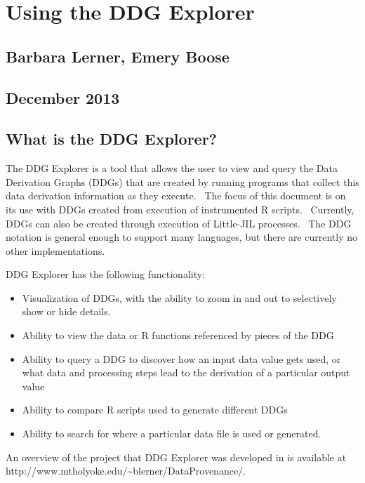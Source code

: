\documentclass[letterpaper]{article}
\title{}
\newcommand\liststyleWWviiiNumii{%
\renewcommand\labelitemi{•}
\renewcommand\labelitemii{•}
\renewcommand\labelitemiii{•}
\renewcommand\labelitemiv{•}
}
\begin{document}
\clearpage\setcounter{page}{1}\pagestyle{Standard}
\thispagestyle{FirstPage}
\section{Using the DDG Explorer}
\subsection{Barbara Lerner, Emery Boose}
\subsection{December 2013}
\subsection{What is the DDG Explorer?}
{\mdseries\upshape\color{black}
The DDG Explorer is a tool that allows the user to view and query the Data Derivation Graphs (DDGs) that are created by running programs that collect this data derivation information as they execute. \ The focus of this document is on its use with DDGs created from execution of instrumented R scripts. \ Currently, DDGs can also be created through execution of Little-JIL processes. \ The DDG notation is general enough to support many languages, but there are currently no other implementations.}

{\mdseries\upshape\color{black}
DDG Explorer has the following functionality:}

\liststyleWWviiiNumii
\begin{itemize}
\item {\color{black}
Visualization of DDGs, with the ability to zoom in and out to selectively show or hide details.}
\item {\color{black}
Ability to view the data or R functions referenced by pieces of the DDG}
\item {\color{black}
Ability to query a DDG to discover how an input data value gets used, or what data and processing steps lead to the derivation of a particular output value}
\item {\color{black}
Ability to compare R scripts used to generate different DDGs}
\item {\color{black}
Ability to search for where a particular data file is used or generated.}
\end{itemize}
{\mdseries\upshape\color{black}
An overview of the project that DDG Explorer was developed in is available at http://www.mtholyoke.edu/\~{}blerner/DataProvenance/.}
\end{document}
